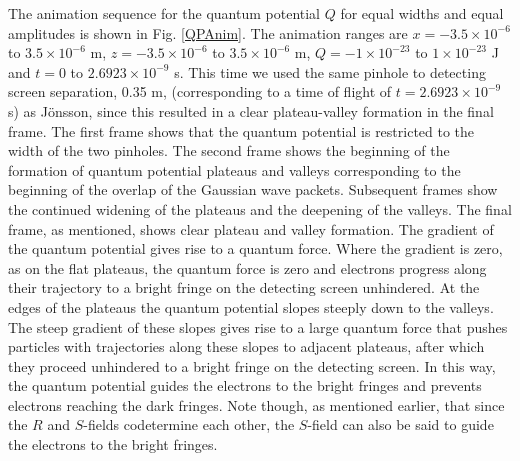 \documentclass[12pt]{article}       %
\begin{document}
The animation sequence for the quantum potential $Q$ for equal widths and equal amplitudes is shown in Fig. \ref{QPAnim}. The animation ranges are  $x=-3.5\times 10^{-6}$ to $3.5\times 10^{-6}$ m, $z=-3.5\times 10^{-6}$ to $3.5\times 10^{-6}$ m, $Q=-1\times 10^{-23}$ to $1\times 10^{-23}$ J and $t=0$ to $2.6923\times 10^{-9}$ s. This time we used the same pinhole to detecting screen  separation, 0.35 m, (corresponding to a time of flight of $t=2.6923\times10^{-9}$ s) as J\"{o}nsson, since this resulted in a clear plateau-valley formation in the final frame. The first frame shows that the quantum potential is restricted to the width of the two pinholes. The second frame shows the beginning of the formation of quantum potential plateaus and valleys  corresponding to the beginning of the overlap of the Gaussian wave packets. Subsequent frames show the continued widening of the plateaus and the deepening of the valleys. The final frame, as mentioned, shows clear plateau and valley formation. 
The gradient of the quantum potential gives rise to a quantum force. Where the gradient is zero, as on the flat plateaus, the quantum force is zero and electrons progress along their trajectory to a bright fringe on the detecting screen unhindered. At the edges of the plateaus the quantum potential slopes steeply down to the valleys. The steep gradient of these slopes gives rise to a large quantum force that pushes particles with trajectories along these slopes to adjacent plateaus, after which they proceed unhindered to a bright fringe on the detecting screen.  In this way, the quantum potential   guides the electrons to the bright fringes and prevents electrons reaching the dark fringes. Note though, as mentioned earlier, that since the $R$ and $S$-fields codetermine each other, the  $S$-field can also be said to guide the electrons to the bright fringes. 
\end{document}
